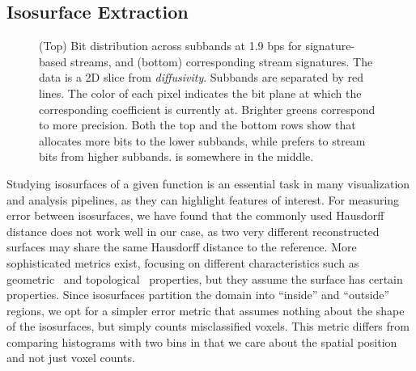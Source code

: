 \subsection{Isosurface Extraction}\label{sec:isocontour}


\begin{figure}[!b]
\centering
\caption{(Top) Bit distribution across subbands at 1.9 bps for signature-based streams, and (bottom)
corresponding stream signatures. The data is a 2D slice from \emph{diffusivity}. Subbands are
separated by red lines. The color of each pixel indicates the bit plane at which the corresponding
coefficient is currently at. Brighter greens correspond to more precision. Both the top and the
bottom rows show that \shsg allocates more bits to the lower subbands, while \slsg prefers to stream
bits from higher subbands. \srsg is somewhere in the middle.}
\label{fig:bit-distrib}
\end{figure}

Studying isosurfaces of a given function is an essential task in many visualization and analysis
pipelines, as they can highlight features of interest. For measuring error between isosurfaces, we
have found that the commonly used Hausdorff distance does not work well in our case, as two very
different reconstructed surfaces may share the same Hausdorff distance to the reference. More
sophisticated metrics exist, focusing on different characteristics such as
geometric~\cite{verifiable-isosurface} and topological~\cite{topology-verification-isosurface}
properties, but they assume the surface has certain properties. Since isosurfaces partition the
domain into ``inside'' and ``outside'' regions, we opt for a simpler error metric that assumes
nothing about the shape of the isosurfaces, but simply counts misclassified voxels. This metric
differs from comparing histograms with two bins in that we care about the spatial position and not
just voxel counts.


